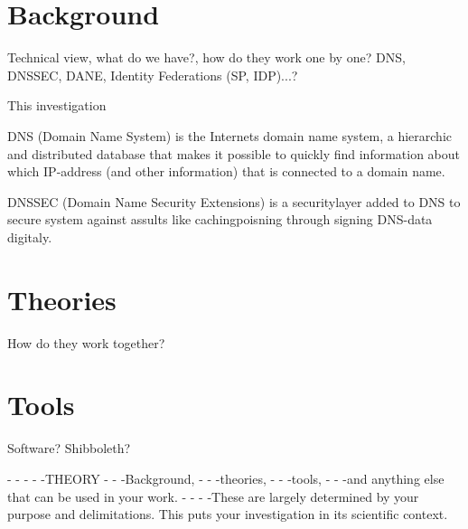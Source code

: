 \section{Background}

Technical view, what do we have?, how do they work one by one? DNS, DNSSEC, DANE, Identity Federations (SP, IDP)...?

This investigation 

DNS (Domain Name System) is the Internets domain name system, a hierarchic and distributed database that makes it possible to quickly find information about which IP-address (and other information) that is connected to a domain name. \cite[p.~64]{book:guide_dns}

DNSSEC (Domain Name Security Extensions) is a securitylayer added to DNS to secure system against assults like cachingpoisning through signing DNS-data digitaly.\cite[p.~64]{book:guide_dns}



\section{Theories}

How do they work together?

\section{Tools}

Software? Shibboleth?



-
-
-
-
-THEORY 
-
-
-Background, 
-
-
-theories, 
-
-
-tools, 
-
-
-and anything else that can be used in your work.
-
-
-
-These are largely determined by your purpose and delimitations. This puts your investigation
in its scientific context.
